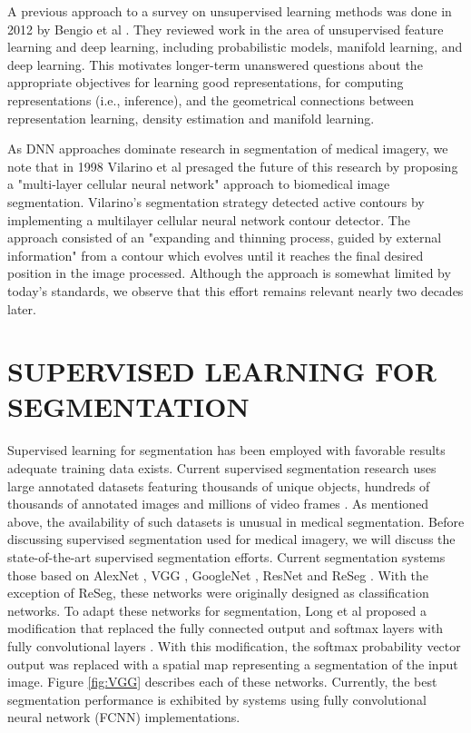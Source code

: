 \documentclass[letterpaper, 10 pt, conference]{ieeeconf}  %
\begin{document}
A previous approach to a survey on unsupervised learning methods was done in 2012 by Bengio et al \cite{bengio_representation_2012}. They reviewed work in the area of unsupervised feature learning and deep learning, including probabilistic models, manifold learning, and deep learning. This motivates longer-term unanswered questions about the appropriate objectives for learning good representations, for computing representations (i.e., inference), and the geometrical connections between representation learning, density estimation and manifold learning.

As DNN approaches dominate research in segmentation of medical imagery, we note that in 1998 Vilarino et al \cite{vilarino_discrete-time_1998} presaged the future of this research by proposing a "multi-layer cellular neural network"  approach to biomedical image segmentation. Vilarino's segmentation strategy detected active contours by implementing a multilayer cellular neural network contour detector. The approach consisted of an "expanding and thinning process, guided by external information" from a contour which evolves until it reaches the final desired position in the image processed. Although the approach is somewhat limited by today's standards, we observe that this effort remains relevant nearly two decades later.

\section{SUPERVISED LEARNING FOR SEGMENTATION}

Supervised learning for segmentation has been employed with favorable results adequate training data exists. Current supervised segmentation research uses large annotated datasets featuring thousands of unique objects, hundreds of thousands of annotated images and millions of video frames \cite{xu2018youtube}. As mentioned above, the availability of such datasets is unusual in medical segmentation. Before discussing supervised segmentation used for medical imagery, we will discuss the state-of-the-art supervised segmentation efforts. Current segmentation systems those based on AlexNet \cite{krizhevsky_imagenet_2012}, VGG \cite{simonyan_very_deep}, GoogleNet \cite{szegedy_deeper}, ResNet \cite{he_deep_residual} and ReSeg \cite{Visin_2016_CVPR_Workshops}. With the exception of ReSeg, these networks were originally designed as classification networks. To adapt these networks for segmentation, Long et al proposed a modification that replaced the fully connected output and softmax layers with fully convolutional layers \cite{long_fully_2015}. With this modification, the softmax probability vector output was replaced with a spatial map representing a segmentation of the input image. Figure \ref{fig:VGG} describes each of these networks. Currently, the best segmentation performance is exhibited by systems using fully convolutional neural network (FCNN) implementations.
\end{document}
